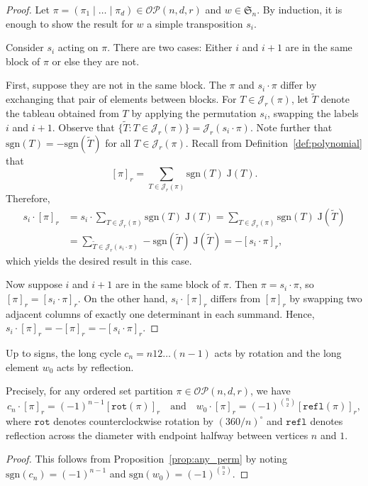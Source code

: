 \documentclass[ALCO, Unicode]{cedram}
\numberwithin{equation}{section}
\newcommand{\rstab}{\mathcal{J}}
\newcommand{\rspoly}{\mathrm{J}}
\newcommand{\sgn}{\mathrm{sgn}}
\newcommand{\ordsetpart}{\mathcal{OP}}
\begin{document}
\begin{proof}
Let $\pi=(\pi_1\mid \dots\mid \pi_d)\in\ordsetpart(n,d,r)$ and $w\in \mathfrak{S}_n$. By induction, it is enough to show the result for $w$ a simple transposition $s_i$. 

Consider $s_i$ acting on $\pi$. There are two cases: Either $i$ and $i+1$ are in the same block of $\pi$ or else they are not. 
 
First, suppose they are not in the same block. The $\pi$ and $s_i \cdot \pi$ differ by exchanging that pair of elements between blocks. For $T\in\rstab_r(\pi)$, let $\widetilde{T}$ denote the tableau obtained from $T$ by applying the permutation $s_i$, swapping the labels $i$ and $i+1$.
Observe that $\{ \widetilde{T} : T \in \rstab_r(\pi) \} = \rstab_r(s_i \cdot \pi)$.
Note further that $\sgn(T) = -\sgn(\widetilde{T})$ for all $T \in \rstab_r(\pi)$. 
Recall from Definition~\ref{def:polynomial} that \[[\pi]_r = \sum_{T\in \rstab_r(\pi)}\sgn(T) \; \rspoly(T).\]
Therefore, 
\begin{align*}  s_i \cdot [\pi]_r  &=   s_i \cdot \sum_{T\in \rstab_r(\pi)}\sgn(T) \; \rspoly(T) =  \sum_{T\in \rstab_r(\pi)} \sgn(T) \; \rspoly(\widetilde{T})  \\ &= \sum_{\tilde{T}\in \rstab_r(s_i \cdot \pi)} -\sgn(\widetilde{T}) \; \rspoly(\widetilde{T}) = -[s_i \cdot \pi]_r,
\end{align*}
which yields the desired result in this case.

Now suppose $i$ and $i+1$ are in the same block of $\pi$. Then $\pi = s_i \cdot \pi$, so $[\pi]_r = [s_i \cdot \pi]_r$. On the other hand, $s_i \cdot [\pi]_r$ differs from $[\pi]_r$ by swapping two adjacent columns of exactly one determinant in each summand. Hence, $s_i \cdot [\pi]_r = - [\pi]_r = -[s_i\cdot\pi]_r$.
\end{proof}

\begin{corollary}
\label{prop:rotation}
Up to signs, the long cycle $c_n = n12\dots (n-1)$ acts by rotation and the long element $w_0$ acts by reflection.

Precisely, for any ordered set partition $\pi \in \ordsetpart(n,d,r)$, we have 
\[
c_n \cdot [\pi]_r = (-1)^{n-1} [\mathtt{rot}(\pi)]_r \quad \text{and} \quad w_0 \cdot [\pi]_r = (-1)^{\binom{n}{2}} [\mathtt{refl}(\pi)]_r,
\]
where $\mathtt{rot}$ denotes counterclockwise rotation by $(360/n)^\circ$ and $\mathtt{refl}$ denotes reflection across the diameter with endpoint halfway between vertices $n$ and $1$.
\end{corollary}
\begin{proof}
This follows from Proposition~\ref{prop:any_perm} by noting $\sgn(c_n)=(-1)^{n-1}$ and $\sgn(w_0)=(-1)^{\binom{n}{2}}$.
\end{proof}
\end{document}
